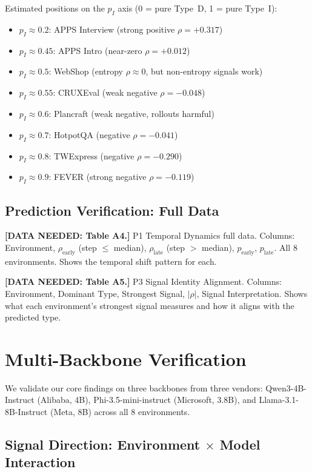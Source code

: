 Estimated positions on the $p_I$ axis (0 = pure Type~D, 1 = pure Type~I):
\begin{itemize}[nosep,leftmargin=*]
\item $p_I \approx 0.2$: APPS Interview (strong positive $\rho = +0.317$)
\item $p_I \approx 0.45$: APPS Intro (near-zero $\rho = +0.012$)
\item $p_I \approx 0.5$: WebShop (entropy $\rho \approx 0$, but non-entropy signals work)
\item $p_I \approx 0.55$: CRUXEval (weak negative $\rho = -0.048$)
\item $p_I \approx 0.6$: Plancraft (weak negative, rollouts harmful)
\item $p_I \approx 0.7$: HotpotQA (negative $\rho = -0.041$)
\item $p_I \approx 0.8$: TWExpress (negative $\rho = -0.290$)
\item $p_I \approx 0.9$: FEVER (strong negative $\rho = -0.119$)
\end{itemize}

\subsection{Prediction Verification: Full Data}

{\color{blue} \textbf{[DATA NEEDED: Table A4.]} P1 Temporal Dynamics full data.
Columns: Environment, $\rho_{\text{early}}$ (step $\leq$ median),
$\rho_{\text{late}}$ (step $>$ median), $p_{\text{early}}$, $p_{\text{late}}$.
All 8 environments. Shows the temporal shift pattern for each.}

{\color{blue} \textbf{[DATA NEEDED: Table A5.]} P3 Signal Identity Alignment.
Columns: Environment, Dominant Type, Strongest Signal, $|\rho|$,
Signal Interpretation. Shows what each environment's strongest
signal measures and how it aligns with the predicted type.}


\section{Multi-Backbone Verification}
\label{app:multi-backbone}

We validate our core findings on three backbones from three vendors:
Qwen3-4B-Instruct (Alibaba, 4B), Phi-3.5-mini-instruct (Microsoft, 3.8B),
and Llama-3.1-8B-Instruct (Meta, 8B) across all 8 environments.

\subsection{Signal Direction: Environment $\times$ Model Interaction}

